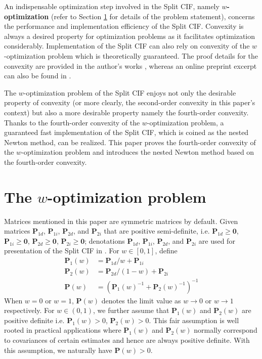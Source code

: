 \documentclass[12pt]{article}
\begin{document}
An indispensable optimization step involved in the Split CIF, namely \textbf{$w$-optimization} (refer to Section \ref{sec:woptprob} for details of the problem statement), concerns the performance and implementation efficiency of the Split CIF. Convexity is always a desired property for optimization problems as it facilitates optimization considerably. Implementation of the Split CIF can also rely on convexity of the $w$-optimization problem which is theoretically guaranteed. The proof details for the convexity are provided in the author's works \cite{Li2022FARET_2, Li2022FARET_1}, whereas an online preprint excerpt can also be found in \cite{Li2021WOpt}.

The $w$-optimization problem of the Split CIF enjoys not only the desirable property of convexity (or more clearly, the second-order convexity in this paper's context) but also a more desirable property namely the fourth-order convexity. Thanks to the fourth-order convexity of the $w$-optimization problem, a guaranteed fast implementation of the Split CIF, which is coined as the nested Newton method, can be realized. This paper proves the fourth-order convexity of the $w$-optimization problem and introduces the nested Newton method based on the fourth-order convexity.

\section{The $w$-optimization problem} \label{sec:woptprob}

Matrices mentioned in this paper are symmetric matrices by default. Given matrices $\mathbf{P}_{1d}$, $\mathbf{P}_{1i}$, $\mathbf{P}_{2d}$, and $\mathbf{P}_{2i}$ that are positive semi-definite, i.e. $\mathbf{P}_{1d} \geq \mathbf{0}$, $\mathbf{P}_{1i} \geq \mathbf{0}$, $\mathbf{P}_{2d} \geq \mathbf{0}$, $\mathbf{P}_{2i} \geq \mathbf{0}$; denotations $\mathbf{P}_{1d}$, $\mathbf{P}_{1i}$, $\mathbf{P}_{2d}$, and $\mathbf{P}_{2i}$ are used for presentation of the Split CIF in \cite{Li2013a}. For $w \in [0,1]$, define
\begin{align} \label{eq:defineP}
\mathbf{P}_{1}(w) &= \mathbf{P}_{1d}/w + \mathbf{P}_{1i} \nonumber \\
\mathbf{P}_{2}(w) &= \mathbf{P}_{2d}/(1-w) + \mathbf{P}_{2i} \nonumber \\
\mathbf{P}(w) &= (\mathbf{P}_{1}(w)^{-1} + \mathbf{P}_{2}(w)^{-1})^{-1}
\end{align}
When $w=0$ or $w=1$, $\mathbf{P}(w)$ denotes the limit value as $w \to 0$ or $w \to 1$ respectively. For $w \in (0,1)$, we further assume that $\mathbf{P}_{1}(w)$ and $\mathbf{P}_{2}(w)$ are positive definite i.e. $\mathbf{P}_{1}(w)>0$, $\mathbf{P}_{2}(w)>0$. This fair assumption is well rooted in practical applications where $\mathbf{P}_{1}(w)$ and $\mathbf{P}_{2}(w)$ normally correspond to covariances of certain estimates and hence are always positive definite. With this assumption, we naturally have $\mathbf{P}(w)>0$.
\end{document}

